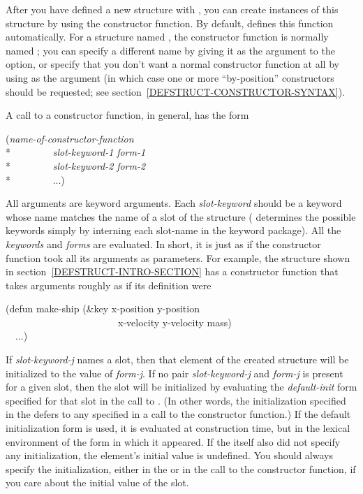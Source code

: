 After you have defined a new structure with , you can
create instances of this structure by using the constructor function.
By default,  defines this function automatically.
For a structure named , the constructor function is normally
named ;
you can specify a different name
by giving it as the argument to the
 option, or specify that you don't
want a normal
constructor function at all by using {\false} as the argument
(in which case one or more ``by-position'' constructors should be
requested; see section~\ref{DEFSTRUCT-CONSTRUCTOR-SYNTAX}).

A call to a constructor function, in general, has the form
\begin{lisp}
(\emph{name-of-constructor-function} \\*
~~~~~~~~\emph{slot-keyword-1} \emph{form-1} \\*
~~~~~~~~\emph{slot-keyword-2} \emph{form-2} \\*
~~~~~~~~...)
\end{lisp}
All arguments are keyword arguments.  Each \emph{slot-keyword} should be a
keyword whose name matches the name of a slot of the structure
( determines the possible keywords simply by interning each
slot-name in the keyword package).  All the \emph{keywords} and \emph{forms}
are evaluated.  In short, it is just as if the constructor function
took all its arguments as  parameters.  For example, the
 structure shown in section~\ref{DEFSTRUCT-INTRO-SECTION}
has a constructor function that takes arguments roughly as if its definition
were
\begin{lisp}
(defun make-ship (\&key x-position y-position \\
~~~~~~~~~~~~~~~~~~~~~~~x-velocity y-velocity mass) \\
~~...)
\end{lisp}

\label{defstruct-initialization}
If \emph{slot-keyword-j} names a slot, then that element of
the created structure will be initialized to the value of \emph{form-j}.
If no pair \emph{slot-keyword-j} and \emph{form-j}
is present for a given slot, then the slot will be
initialized by evaluating the \emph{default-init} form specified
for that slot in the call to .
(In other words, the initialization specified in the 
defers to any specified in a call to the constructor function.)
If the default initialization form is used, it is evaluated
at construction time, but
in the lexical environment of the  form in which it appeared.
If the  itself also did not
specify any initialization, the element's initial value is undefined.
You should always specify the initialization, either in the 
or in the call to the constructor function,
if you care about the initial value of the slot.

